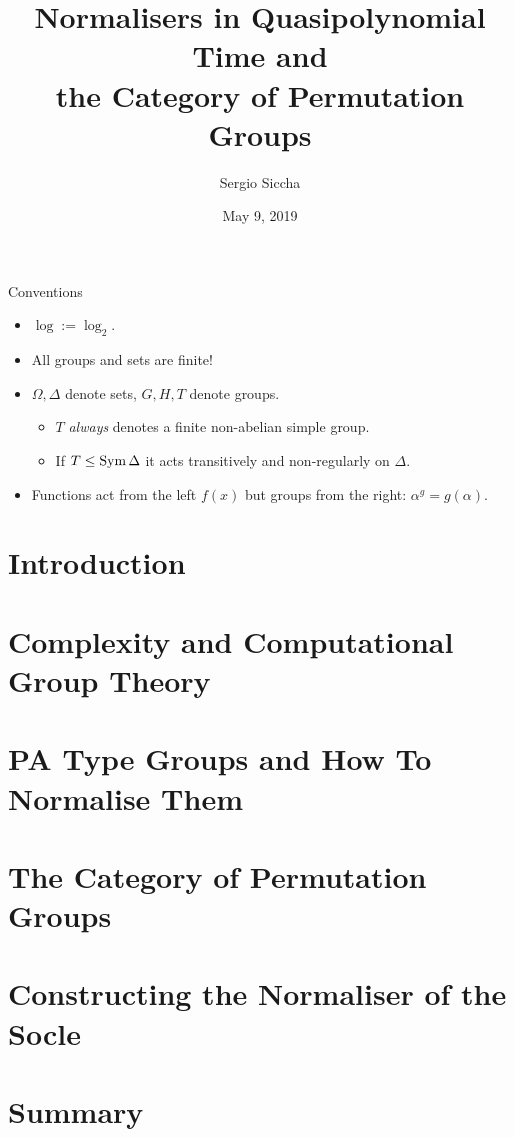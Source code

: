 \documentclass{beamer}
\title{Normalisers in Quasipolynomial Time and \\
the Category of Permutation Groups}
\date{May 9, 2019}
\author{Sergio Siccha}
\institute{Lehr- und Forschungsgebiet Algebra, RWTH Aachen}
\theoremstyle{plain}
\theoremstyle{definition}
\begin{document}
\maketitle


\begin{frame}{Conventions}
\begin{itemize}
\setlength\itemsep{1em}
\item
$\log := \log_2$.
\pause
\item
All groups and sets are finite!
\pause
\item
$\Omega, \Delta$ denote sets,
$G, H, T$ denote groups.
\pause
\begin{itemize}
    \item
    $T$ \emph{always} denotes a finite non-abelian simple group.
    \pause
    \item
    If $T \leq \operatorname{Sym} \Delta$ it acts transitively and non-regularly on $\Delta$.
    \pause
\end{itemize}
\item
Functions act from the left $f(x)$
but groups from the right: $\alpha ^ g = g(\alpha)$.
\end{itemize}
\end{frame}

\section{Introduction}


\section{Complexity and Computational Group Theory}


\section{PA Type Groups and How To Normalise Them}


\section{The Category of Permutation Groups}


\section{Constructing the Normaliser of the Socle}


\section{Summary}

\end{document}
